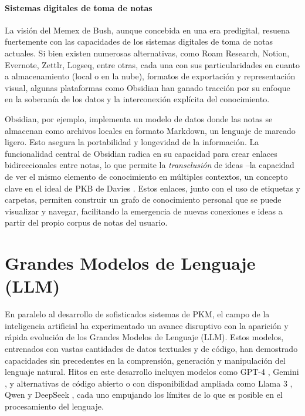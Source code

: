 \paragraph{Sistemas digitales de toma de notas}
\label{par:sistemas_digitales_toma_notas}
La visión del Memex de Bush, aunque concebida en una era predigital, resuena fuertemente con las capacidades de los sistemas digitales de toma de notas actuales. Si bien existen numerosas alternativas, como Roam Research, Notion, Evernote, Zettlr, Logseq, entre otras, cada una con sus particularidades en cuanto a almacenamiento (local o en la nube), formatos de exportación y representación visual, algunas plataformas como Obsidian han ganado tracción por su enfoque en la soberanía de los datos y la interconexión explícita del conocimiento.

Obsidian, por ejemplo, implementa un modelo de datos donde las notas se almacenan como archivos locales en formato Markdown, un lenguaje de marcado ligero. Esto asegura la portabilidad y longevidad de la información. La funcionalidad central de Obsidian radica en su capacidad para crear enlaces bidireccionales entre notas, lo que permite la \textit{transclusión} de ideas –la capacidad de ver el mismo elemento de conocimiento en múltiples contextos, un concepto clave en el ideal de PKB de Davies \citep{daviesBuildingMemexSixty}. Estos enlaces, junto con el uso de etiquetas y carpetas, permiten construir un grafo de conocimiento personal que se puede visualizar y navegar, facilitando la emergencia de nuevas conexiones e ideas a partir del propio corpus de notas del usuario.

\section{Grandes Modelos de Lenguaje (LLM)}
\label{sec:grandes_modelos_lenguaje}

En paralelo al desarrollo de sofisticados sistemas de PKM, el campo de la inteligencia artificial ha experimentado un avance disruptivo con la aparición y rápida evolución de los Grandes Modelos de Lenguaje (LLM). Estos modelos, entrenados con vastas cantidades de datos textuales y de código, han demostrado capacidades sin precedentes en la comprensión, generación y manipulación del lenguaje natural. Hitos en este desarrollo incluyen modelos como GPT-4 \citep{openaiGPT4TechnicalReport2024}, Gemini \citep{teamGeminiFamilyHighly2024}, y alternativas de código abierto o con disponibilidad ampliada como Llama 3 \citep{grattafioriLlama3Herd2024}, Qwen \citep{baiQwenTechnicalReport2023} y DeepSeek \citep{deepseek-aiDeepSeekV3TechnicalReport2024}, cada uno empujando los límites de lo que es posible en el procesamiento del lenguaje.

